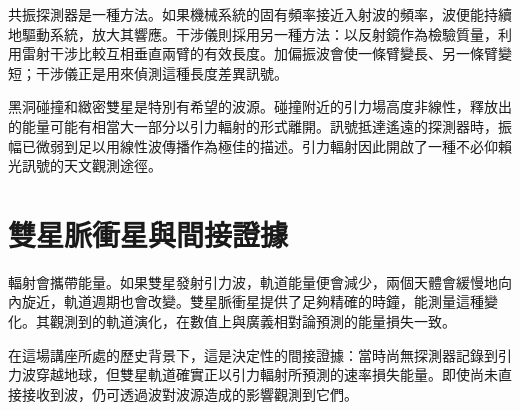 共振探測器是一種方法。如果機械系統的固有頻率接近入射波的頻率，波便能持續地驅動系統，放大其響應。干涉儀則採用另一種方法：以反射鏡作為檢驗質量，利用雷射干涉比較互相垂直兩臂的有效長度。加偏振波會使一條臂變長、另一條臂變短；干涉儀正是用來偵測這種長度差異訊號。

\begin{classroomqa}
\end{classroomqa}

\begin{classroomqa}
\end{classroomqa}

\begin{classroomqa}
\end{classroomqa}

黑洞碰撞和緻密雙星是特別有希望的波源。碰撞附近的引力場高度非線性，釋放出的能量可能有相當大一部分以引力輻射的形式離開。訊號抵達遙遠的探測器時，振幅已微弱到足以用線性波傳播作為極佳的描述。引力輻射因此開啟了一種不必仰賴光訊號的天文觀測途徑。

\section{雙星脈衝星與間接證據}

輻射會攜帶能量。如果雙星發射引力波，軌道能量便會減少，兩個天體會緩慢地向內旋近，軌道週期也會改變。雙星脈衝星提供了足夠精確的時鐘，能測量這種變化。其觀測到的軌道演化，在數值上與廣義相對論預測的能量損失一致。

在這場講座所處的歷史背景下，這是決定性的間接證據：當時尚無探測器記錄到引力波穿越地球，但雙星軌道確實正以引力輻射所預測的速率損失能量。即使尚未直接接收到波，仍可透過波對波源造成的影響觀測到它們。

